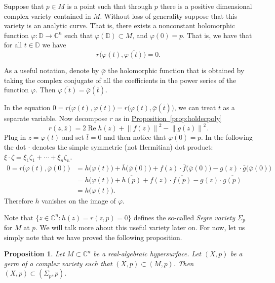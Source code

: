 \documentclass[12pt,openany]{book}
\renewcommand{\Re}{\operatorname{Re}}
\newcommand{\norm}[1]{\left\lVert {#1} \right\rVert}
\newcommand{\C}{{\mathbb{C}}}
\newcommand{\bD}{{\mathbb{D}}}
\newcommand{\myindex}[1]{#1\index{#1}}
\theoremstyle{plain}
\newtheorem{prop}[thm]{Proposition}
\theoremstyle{remark}
\theoremstyle{definition}
\theoremstyle{exercise}
\theoremstyle{example}
\newcommand{\propref}[1]{\hyperref[#1]{Proposition~\ref*{#1}}}
\begin{document}
Suppose that $p \in M$ is a point such that through $p$
there is a positive dimensional
complex variety contained in $M$.  Without loss of generality suppose that
this variety is an analytic curve.  That is, there exists a nonconstant
holomorphic
function $\varphi \colon \bD \to \C^n$ such that $\varphi(\bD) \subset M$,
and $\varphi(0) = p$.
That is,
we have that for all $t \in \bD$ we have
\begin{equation}
r\bigl(\varphi(t),\overline{\varphi(t)}\bigr) = 0 .
\end{equation}

As a useful notation, denote by $\bar{\varphi}$ the holomorphic
function that is obtained by taking the complex conjugate of
all the coefficients in the power series of the function $\varphi$.  Then
$\overline{\varphi(t)} = 
\bar{\varphi}(\bar{t})$.

In the equation
$0 = r\bigl(\varphi(t),\overline{\varphi(t)}\bigr) = 
r\bigl(\varphi(t),\bar{\varphi}(\bar{t})\bigr)$, we can treat $\bar{t}$ as a separate
variable.  Now decompose $r$ as in \propref{prop:holdecpoly}
\begin{equation}
r(z,\bar{z}) = 2 \Re h(z) + \norm{f(z)}^2-\norm{g(z)}^2 .
\end{equation}
Plug in $z=\varphi(t)$ and set $\bar{t} = 0$ and then notice that $\varphi(0) =
p$.  In the following the dot $\cdot$ denotes the simple symmetric (not Hermitian)
dot product:
$\xi \cdot \zeta = \xi_1 \zeta_1 + \cdots + \xi_n \zeta_n$.
\begin{equation}
\begin{split}
0 = 
r\bigl(\varphi(t),\bar{\varphi}(0)) & =
h\bigl(\varphi(t)\bigr)
+
\bar{h}\bigl(\bar{\varphi}(0)\bigr)
+ f(z)\cdot \bar{f}\bigl(\bar{\varphi}(0)\bigr)
- g(z)\cdot \bar{g}\bigl(\bar{\varphi}(0)\bigr)
\\
& =
h\bigl(\varphi(t)\bigr)
+
\overline{h(p)}
+ f(z)\cdot \overline{f(p)}
- g(z)\cdot \overline{g(p)}
\\
& = h\bigl(\varphi(t)\bigr) .
\end{split}
\end{equation}
Therefore $h$ vanishes on the image of $\varphi$.

Note that $\{ z \in \C^n : h(z) = r(z,p) = 0 \}$ defines the so-called
\emph{\myindex{Segre variety}} $\Sigma_p$ for $M$ at $p$.  We will talk
more about this useful variety later on.  For now, let us simply note that
we have proved the following proposition.

\begin{prop}
Let $M \subset \C^n$ be a real-algebraic hypersurface.
Let $(X,p)$ be a germ of a complex variety such that
$(X,p) \subset (M,p)$.  Then $(X,p) \subset (\Sigma_p,p)$.
\end{prop}
\end{document}
